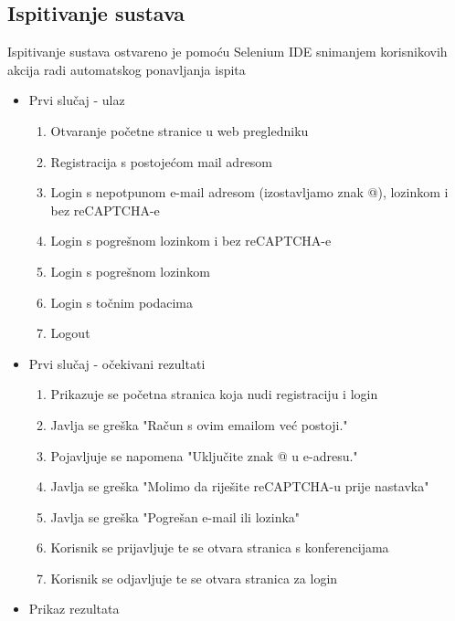 			
			\subsection{Ispitivanje sustava}
			
			 \textit{} Ispitivanje sustava ostvareno je pomoću Selenium IDE snimanjem korisnikovih akcija radi automatskog ponavljanja ispita
			 \begin{itemize}
			 	\item Prvi slučaj - ulaz
			 			\begin{enumerate}
			 				\item Otvaranje početne stranice u web pregledniku
			 				\item Registracija s postojećom mail adresom
			 				\item Login s nepotpunom e-mail adresom (izostavljamo znak @), lozinkom i bez reCAPTCHA-e
			 				\item Login s pogrešnom lozinkom i bez reCAPTCHA-e
			 				\item Login s pogrešnom lozinkom
			 				\item Login s točnim podacima
			 				\item Logout
			 			\end{enumerate}
			 	\item Prvi slučaj - očekivani rezultati
			 			\begin{enumerate}
			 				\item Prikazuje se početna stranica koja nudi registraciju i login
			 				\item Javlja se greška "Račun s ovim emailom već postoji."
			 				\item Pojavljuje se napomena "Uključite znak @ u e-adresu."
			 				\item Javlja se greška "Molimo da riješite reCAPTCHA-u prije nastavka"
			 				\item Javlja se greška "Pogrešan e-mail ili lozinka"
			 				\item Korisnik se prijavljuje te se otvara stranica s konferencijama
			 				\item Korisnik se odjavljuje te se otvara stranica za login
			 			\end{enumerate}
			 	\item Prikaz rezultata
			 			\begin{figure}[htb]
			 				\centering

\end{figure}
\end{itemize}

